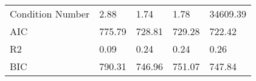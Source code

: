\begin{table}
\begin{center}
\begin{tabular}{lllll}
Condition Number                               & 2.88   & 1.74     & 1.78     & 34609.39   \\
AIC                                            & 775.79 & 728.81   & 729.28   & 722.42     \\
R2                                             & 0.09   & 0.24     & 0.24     & 0.26       \\
BIC                                            & 790.31 & 746.96   & 751.07   & 747.84     \\
\hline
\end{tabular}
\end{center}
\end{table}